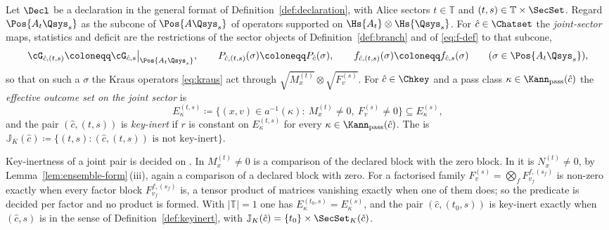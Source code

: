 \begin{definition}\label{def:joint-sectors}
Let $\Decl$ be a declaration in the general format of
Definition~\ref{def:declaration}, with Alice sectors $t\in\mathbb{T}$ and
 $(t,s)\in\mathbb{T}\times\SecSet$. Regard
$\Pos{A_t\Qsys_s}$ as the subcone of $\Pos{A\Qsys_s}$ of operators supported
on $\Hs{A_t}\otimes\Hs{\Qsys_s}$. For $\hat c\in\Chatset$ the
\emph{joint-sector} maps, statistics and deficit are the restrictions of the
sector objects of Definition~\ref{def:branch} and of \eqref{eq:f-def} to that
subcone,
\begin{equation}\label{eq:joint-deficit}
  \cG_{\hat c,(t,s)}\coloneqq\cG_{\hat c,s}\big|_{\Pos{A_t\Qsys_s}},\qquad
  P_{\hat c,(t,s)}(\sigma)\coloneqq P_{\hat c}(\sigma),\qquad
  f_{\hat c,(t,s)}(\sigma)\coloneqq f_{\hat c,s}(\sigma)
  \qquad(\sigma\in\Pos{A_t\Qsys_s}),
\end{equation}
so that on such a $\sigma$ the Kraus operators \eqref{eq:kraus} act through
$\sqrt{M^{(t)}_x}\otimes\sqrt{F^{(s)}_v}$. For
$\hat c\in\Chkey$ and a pass class $\kappa\in\Kann_{\mathrm{pass}}(\hat c)$
the \emph{effective outcome set on the joint sector} is
\begin{equation}\label{eq:joint-effective}
  E^{(t,s)}_{\kappa}\coloneqq\big\{(x,v)\in a^{-1}(\kappa):\
  M^{(t)}_x\ne0,\ F^{(s)}_v\ne0\big\}\subseteq E^{(s)}_{\kappa},
\end{equation}
and the pair $(\hat c,(t,s))$ is \emph{key-inert} if $r$ is constant on
$E^{(t,s)}_{\kappa}$ for every $\kappa\in\Kann_{\mathrm{pass}}(\hat c)$. The
is $\mathbb{J}_K(\hat c)\coloneqq\{(t,s):(\hat c,(t,s))\text{ is not
key-inert}\}$.

Key-inertness of a joint pair is decided on . In
\tref{POVM form} $M^{(t)}_x\ne0$ is a comparison of the declared block with
the zero block. In \tref{ensemble form} it is $N^{(t)}_x\ne0$, by
Lemma~\ref{lem:ensemble-form}\,(iii), again a comparison of a declared block
with zero. For a factorised family
$F^{(s)}_v=\bigotimes_fF^{f,(s_f)}_{v_f}$ is non-zero exactly when every
factor block $F^{f,(s_f)}_{v_f}$ is, a tensor product of matrices vanishing
exactly when one of them does; so the predicate is decided per factor and no
product is formed. With $|\mathbb{T}|=1$ one has
$E^{(t_0,s)}_{\kappa}=E^{(s)}_{\kappa}$, and the pair $(\hat c,(t_0,s))$ is
key-inert exactly when $(\hat c,s)$ is in the sense of
Definition~\ref{def:keyinert}, with
$\mathbb{J}_K(\hat c)=\{t_0\}\times\SecSet_K(\hat c)$.
\end{definition}
